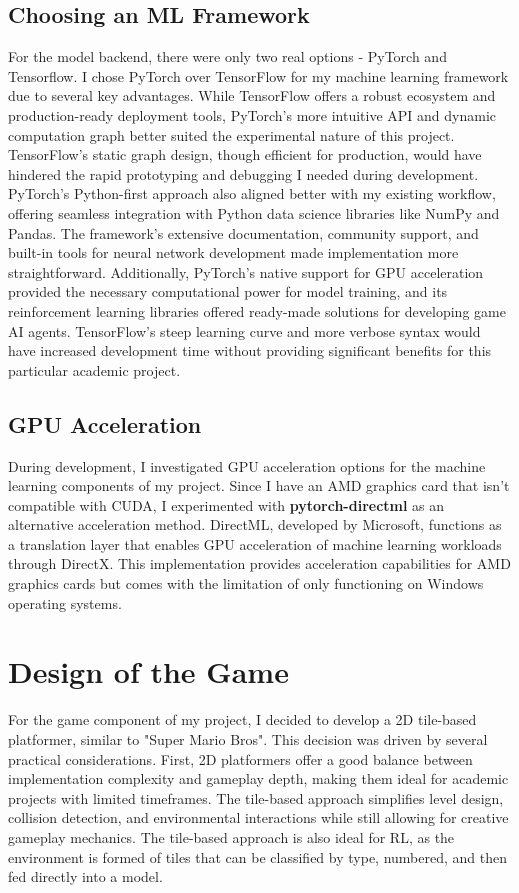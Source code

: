 \subsection{Choosing an ML Framework}

For the model backend, there were only two real options - PyTorch and Tensorflow.
I chose PyTorch over TensorFlow for my machine learning framework due to several key advantages. 
While TensorFlow offers a robust ecosystem and production-ready deployment tools, PyTorch's more intuitive API and dynamic computation graph better suited the experimental nature of this project. 
TensorFlow's static graph design, though efficient for production, would have hindered the rapid prototyping and debugging I needed during development. 
PyTorch's Python-first approach also aligned better with my existing workflow, offering seamless integration with Python data science libraries like NumPy and Pandas. 
The framework's extensive documentation, community support, and built-in tools for neural network development made implementation more straightforward. 
Additionally, PyTorch's native support for GPU acceleration provided the necessary computational power for model training, and its reinforcement learning libraries offered ready-made solutions for developing game AI agents. 
TensorFlow's steep learning curve and more verbose syntax would have increased development time without providing significant benefits for this particular academic project.

\subsection{GPU Acceleration}

During development, I investigated GPU acceleration options for the machine learning components of my project. 
Since I have an AMD graphics card that isn't compatible with CUDA, I experimented with \textbf{pytorch-directml} as an alternative acceleration method. 
DirectML, developed by Microsoft, functions as a translation layer that enables GPU acceleration of machine learning workloads through DirectX. 
This implementation provides acceleration capabilities for AMD graphics cards but comes with the limitation of only functioning on Windows operating systems.

\section{Design of the Game}

For the game component of my project, I decided to develop a 2D tile-based platformer, similar to "Super Mario Bros". 
This decision was driven by several practical considerations. 
First, 2D platformers offer a good balance between implementation complexity and gameplay depth, making them ideal for academic projects with limited timeframes.
The tile-based approach simplifies level design, collision detection, and environmental interactions while still allowing for creative gameplay mechanics. 
The tile-based approach is also ideal for RL, as the environment is formed of tiles that can be classified by type, numbered, and then fed directly into a model.

